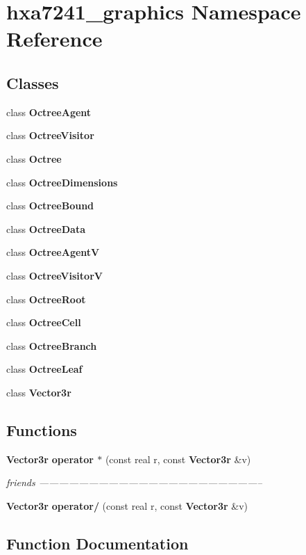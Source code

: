 \section{hxa7241\_\-graphics Namespace Reference}
\label{namespacehxa7241__graphics}


\subsection*{Classes}
\begin{CompactItemize}
\item 
class {\bf Octree\-Agent}
\item 
class {\bf Octree\-Visitor}
\item 
class {\bf Octree}
\item 
class {\bf Octree\-Dimensions}
\item 
class {\bf Octree\-Bound}
\item 
class {\bf Octree\-Data}
\item 
class {\bf Octree\-Agent\-V}
\item 
class {\bf Octree\-Visitor\-V}
\item 
class {\bf Octree\-Root}
\item 
class {\bf Octree\-Cell}
\item 
class {\bf Octree\-Branch}
\item 
class {\bf Octree\-Leaf}
\item 
class {\bf Vector3r}
\end{CompactItemize}
\subsection*{Functions}
\begin{CompactItemize}
\item 
{\bf Vector3r} {\bf operator $\ast$} (const real r, const {\bf Vector3r} \&v)
\begin{CompactList}\small\item\em friends -------------------------------------------------------------------- \item\end{CompactList}\item 
{\bf Vector3r} {\bf operator/} (const real r, const {\bf Vector3r} \&v)
\end{CompactItemize}


\subsection{Function Documentation}

